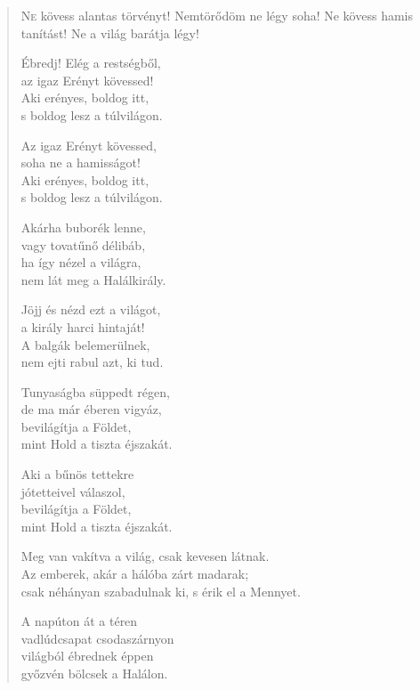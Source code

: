 
\begin{verse}

{\par%
\lettrine{N}{e} {\LettrineTextFont kövess alantas törvényt!}\newline
Nemtörődöm ne légy soha!\newline
Ne kövess hamis tanítást!\verselinebreak
Ne a világ barátja légy!
\par}

 Ébredj! Elég a restségből,\\
az igaz Erényt kövessed!\\
Aki erényes, boldog itt,\\
s boldog lesz a túlvilágon.

 Az igaz Erényt kövessed,\\
soha ne a hamisságot!\\
Aki erényes, boldog itt,\\
s boldog lesz a túlvilágon.

 Akárha buborék lenne,\\
vagy tovatűnő délibáb,\\
ha így nézel a világra,\\
nem lát meg a Halálkirály.

 Jöjj és nézd ezt a világot,\\
a király harci hintaját!\\
A balgák belemerülnek,\\
nem ejti rabul azt, ki tud.

 Tunyaságba süppedt régen,\\
de ma már éberen vigyáz,\\
bevilágítja a Földet,\\
mint Hold a tiszta éjszakát.

 Aki a bűnös tettekre\\
jótetteivel válaszol,\\
bevilágítja a Földet,\\
mint Hold a tiszta éjszakát.

 Meg van vakítva a világ, csak kevesen látnak.\\
Az emberek, akár a hálóba zárt madarak;\\
csak néhányan szabadulnak ki, s érik el a Mennyet.

 A napúton át a téren\\
vadlúdcsapat csodaszárnyon\\
világból ébrednek éppen\\
győzvén bölcsek a Halálon.
\end{verse}
